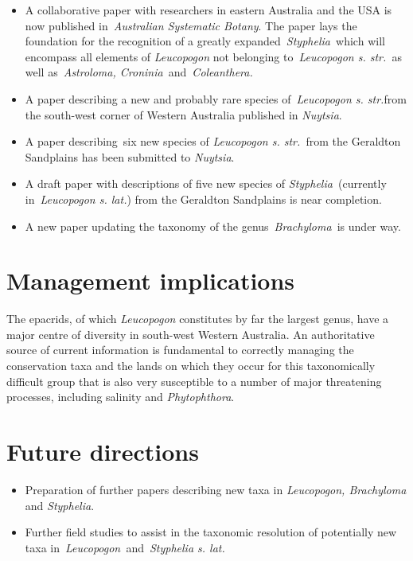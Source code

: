 \documentclass[version=last,
    paper=a4, %
    10pt, %
    usenames,
    dvipsnames,
    oneside, %
    headings=openany, %
    DIV=15 %
]{scrbook}
\begin{document}
\begin{itemize}
\itemsep1pt\parskip0pt
\item
  A collaborative paper with researchers in eastern Australia and the
  USA is now published in~\emph{Australian Systematic Botany}. The paper
  lays the foundation for the recognition of a greatly
  expanded~\emph{Styphelia~}which will encompass all elements of
  \emph{Leucopogon} not belonging to~\emph{Leucopogon s. str.~}as well
  as~\emph{Astroloma, Croninia~}and~\emph{Coleanthera.~}~~
\item
  A paper describing a new and probably rare species of~\emph{Leucopogon
  s. str.}from the south-west corner of Western Australia published in
  \emph{Nuytsia}.
\item
  A paper describing~six new species of \emph{Leucopogon s. str.~}from
  the Geraldton Sandplains has been submitted to \emph{Nuytsia}.
\item
  A draft paper with descriptions of five new species of
  \emph{Styphelia~}(currently in~\emph{Leucopogon s. lat.}) from the
  Geraldton Sandplains is near completion.~
\item
  A new paper updating the taxonomy of the genus~\emph{Brachyloma~}is
  under way.
\end{itemize}



\section*{Management implications}
The epacrids, of which \emph{Leucopogon} constitutes by far the largest
genus, have a major centre of diversity in south-west Western Australia.
An authoritative source of current information is fundamental to
correctly managing the conservation taxa and the lands on which they
occur for this taxonomically difficult group that is also very
susceptible to a number of major threatening processes, including
salinity and \emph{Phytophthora}.



\section*{Future directions}
\begin{itemize}
\itemsep1pt\parskip0pt
\item
  Preparation of further papers describing new taxa in \emph{Leucopogon,
  Brachyloma} and \emph{Styphelia}.
\item
  Further field studies to assist in the taxonomic resolution of
  potentially new taxa in~\emph{Leucopogon~}and~\emph{Styphelia s. lat.}
\end{itemize}



\end{document}
